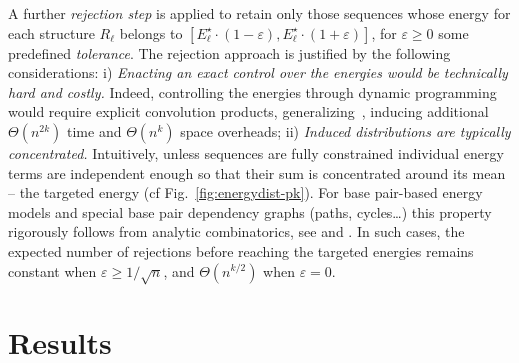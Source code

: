 \documentclass{bmcart}
\newcommand{\Def}[1]{\emph{#1}}
\newcommand{\TargetE}{E^{\star}}
\newcommand{\Nuc}[1]{{\sf #1}}
\newcommand{\Cb}{\Nuc{C}}
\newcommand{\Gb}{\Nuc{G}}
\newcommand{\GCb}{\Gb\Cb}
\newcommand{\Software}[1]{{\ttfamily #1}}
\newcommand{\citep}[1]{\cite{#1}}
\begin{document}
A further \Def{rejection step} is applied to retain only those sequences whose energy for each structure $R_\ell$ belongs to $[\TargetE_\ell\cdot(1-\varepsilon),\TargetE_\ell\cdot(1+\varepsilon)]$, for $\varepsilon\ge 0$ some predefined \Def{tolerance}. The rejection approach is justified by the following considerations:
i) \emph{Enacting an exact control over the energies would  be technically hard and costly.} Indeed, controlling the energies through dynamic programming would require explicit convolution products, generalizing~\citep{Cupal1996}, inducing additional $\Theta(n^{2k})$ time and $\Theta(n^k)$ space overheads;
ii) \emph{Induced distributions are typically concentrated.} Intuitively, unless sequences are fully constrained individual energy terms are independent enough so that their sum is concentrated around its mean -- the targeted energy (cf Fig.~\ref{fig:energydist-pk}).
For base pair-based energy models and special base pair dependency graphs
(paths, cycles\ldots) this property rigorously follows from analytic
combinatorics, see \citep{Bender1983} and
\citep{Drmota1997}. In such cases, the expected number of
rejections before reaching the targeted energies remains constant when
$\varepsilon\ge 1/\sqrt{n}$, and $\Theta(n^{k/2})$ when
$\varepsilon=0$. 


\section*{Results}\label{sec:results}
\end{document}
